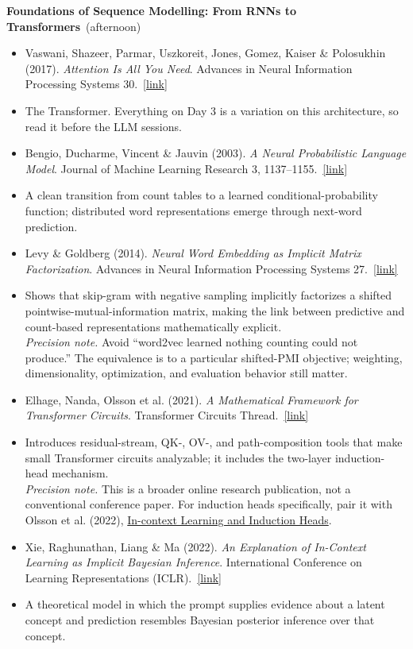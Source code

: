 \documentclass[11pt]{article}
\newcommand{\reading}[5]{%
  \item #1. \textit{#2}. #3.\ \href{#4}{[link]}%
}
\newcommand{\session}[2]{\smallskip\noindent\textbf{\color{accent}#1}\ {\small\color{notegray}(#2)}\par\nopagebreak\smallskip}
\newcommand{\further}{\smallskip\noindent{\small\color{notegray}\textit{Further reading for this session (optional).}}\par\nopagebreak\smallskip}
\newcommand{\pnote}[1]{\\[2pt]\textit{Precision note.} #1}
\begin{document}
\session{Foundations of Sequence Modelling: From RNNs to Transformers}{afternoon}

\begin{itemize}
  \reading{Vaswani, Shazeer, Parmar, Uszkoreit, Jones, Gomez, Kaiser \& Polosukhin (2017)}{Attention Is All You Need}{Advances in Neural Information Processing Systems 30}{https://arxiv.org/abs/1706.03762}{}
  \item[] {\small\color{notegray}The Transformer. Everything on Day 3 is a variation on this architecture, so read it before the LLM sessions.}
\end{itemize}

\further

\begin{itemize}
  \reading{Bengio, Ducharme, Vincent \& Jauvin (2003)}{A Neural Probabilistic Language Model}{Journal of Machine Learning Research 3, 1137--1155}{https://www.jmlr.org/papers/v3/bengio03a.html}{}
  \item[] {\small\color{notegray}A clean transition from count tables to a learned conditional-probability function; distributed word representations emerge through next-word prediction.}
  \reading{Levy \& Goldberg (2014)}{Neural Word Embedding as Implicit Matrix Factorization}{Advances in Neural Information Processing Systems 27}{https://proceedings.neurips.cc/paper_files/paper/2014/hash/b78666971ceae55a8e87efb7cbfd9ad4-Abstract.html}{}
  \item[] {\small\color{notegray}Shows that skip-gram with negative sampling implicitly factorizes a shifted pointwise-mutual-information matrix, making the link between predictive and count-based representations mathematically explicit.\pnote{Avoid ``word2vec learned nothing counting could not produce.'' The equivalence is to a particular shifted-PMI objective; weighting, dimensionality, optimization, and evaluation behavior still matter.}}
  \reading{Elhage, Nanda, Olsson et al. (2021)}{A Mathematical Framework for Transformer Circuits}{Transformer Circuits Thread}{https://transformer-circuits.pub/2021/framework/index.html}{}
  \item[] {\small\color{notegray}Introduces residual-stream, QK-, OV-, and path-composition tools that make small Transformer circuits analyzable; it includes the two-layer induction-head mechanism.\pnote{This is a broader online research publication, not a conventional conference paper. For induction heads specifically, pair it with Olsson et al. (2022), \href{https://transformer-circuits.pub/2022/in-context-learning-and-induction-heads/}{In-context Learning and Induction Heads}.}}
  \reading{Xie, Raghunathan, Liang \& Ma (2022)}{An Explanation of In-Context Learning as Implicit Bayesian Inference}{International Conference on Learning Representations (ICLR)}{https://openreview.net/forum?id=RdJVFCHjUMI}{}
  \item[] {\small\color{notegray}A theoretical model in which the prompt supplies evidence about a latent concept and prediction resembles Bayesian posterior inference over that concept.}
\end{itemize}
\end{document}

